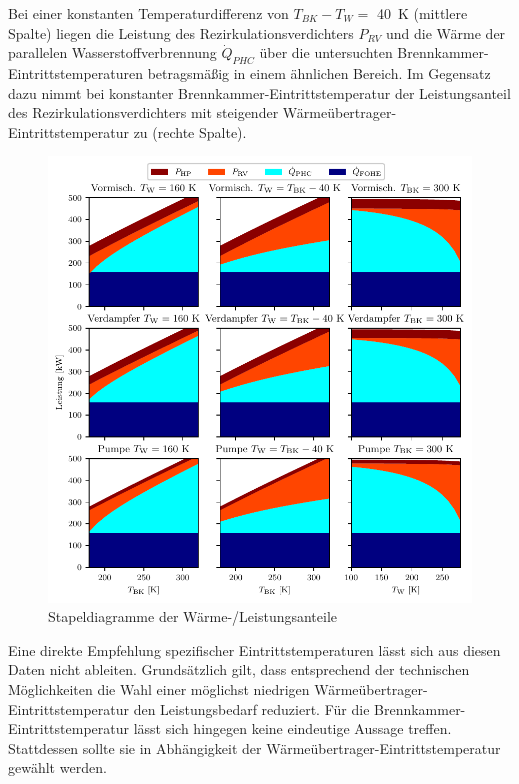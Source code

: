 Bei einer konstanten Temperaturdifferenz von $T_{BK}-T_W=$ \SI{40}{\K} (mittlere Spalte) liegen die Leistung des Rezirkulationsverdichters $P_{RV}$ und die Wärme der parallelen Wasserstoffverbrennung $\dot{Q}_{PHC}$ über die untersuchten Brennkammer-Eintrittstemperaturen betragsmäßig in einem ähnlichen Bereich. Im Gegensatz dazu nimmt bei konstanter Brennkammer-Eintrittstemperatur der Leistungsanteil des Rezirkulationsverdichters mit steigender Wärmeübertrager-Eintrittstemperatur zu (rechte Spalte).

\begin{figure}[ht]
\centering
\includegraphics[width=1\linewidth]{4_Abbildungen/2_Hauptteil/Ergebnisse/stackplot_summary.pdf}
  \caption{Stapeldiagramme der Wärme-/Leistungsanteile}
  \label{fig:stackplot}
\end{figure}
\FloatBarrier

Eine direkte Empfehlung spezifischer Eintrittstemperaturen lässt sich aus diesen Daten nicht ableiten. Grundsätzlich gilt, dass entsprechend der technischen Möglichkeiten die Wahl einer möglichst niedrigen Wärmeübertrager-Eintrittstemperatur den Leistungsbedarf reduziert. Für die Brennkammer-Eintrittstemperatur lässt sich hingegen keine eindeutige Aussage treffen. Stattdessen sollte sie in Abhängigkeit der Wärmeübertrager-Eintrittstemperatur gewählt werden.

